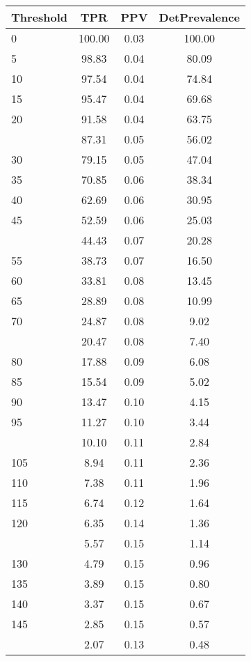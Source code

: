 \begin{table}[ht]
\centering
\begin{tabular}{lccc}
  \toprule
Threshold & TPR & PPV & DetPrevalence \\ 
  \midrule
0 & 100.00 & 0.03 & 100.00 \\ 
  5 & 98.83 & 0.04 & 80.09 \\ 
  10 & 97.54 & 0.04 & 74.84 \\ 
  15 & 95.47 & 0.04 & 69.68 \\ 
  20 & 91.58 & 0.04 & 63.75 \\ 
   \addlinespace
25 & 87.31 & 0.05 & 56.02 \\ 
  30 & 79.15 & 0.05 & 47.04 \\ 
  35 & 70.85 & 0.06 & 38.34 \\ 
  40 & 62.69 & 0.06 & 30.95 \\ 
  45 & 52.59 & 0.06 & 25.03 \\ 
   \addlinespace
50 & 44.43 & 0.07 & 20.28 \\ 
  55 & 38.73 & 0.07 & 16.50 \\ 
  60 & 33.81 & 0.08 & 13.45 \\ 
  65 & 28.89 & 0.08 & 10.99 \\ 
  70 & 24.87 & 0.08 & 9.02 \\ 
   \addlinespace
75 & 20.47 & 0.08 & 7.40 \\ 
  80 & 17.88 & 0.09 & 6.08 \\ 
  85 & 15.54 & 0.09 & 5.02 \\ 
  90 & 13.47 & 0.10 & 4.15 \\ 
  95 & 11.27 & 0.10 & 3.44 \\ 
   \addlinespace
100 & 10.10 & 0.11 & 2.84 \\ 
  105 & 8.94 & 0.11 & 2.36 \\ 
  110 & 7.38 & 0.11 & 1.96 \\ 
  115 & 6.74 & 0.12 & 1.64 \\ 
  120 & 6.35 & 0.14 & 1.36 \\ 
   \addlinespace
125 & 5.57 & 0.15 & 1.14 \\ 
  130 & 4.79 & 0.15 & 0.96 \\ 
  135 & 3.89 & 0.15 & 0.80 \\ 
  140 & 3.37 & 0.15 & 0.67 \\ 
  145 & 2.85 & 0.15 & 0.57 \\ 
   \addlinespace
150 & 2.07 & 0.13 & 0.48 \\ 

\end{tabular}
\end{table}
